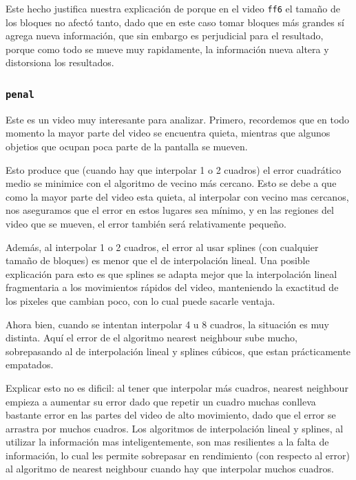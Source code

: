 Este hecho justifica nuestra explicación de porque en el video \texttt{ff6} el tamaño de los bloques no afectó tanto, dado que en este caso tomar bloques más grandes sí agrega nueva información, que sin embargo es perjudicial para el resultado, porque como todo se mueve muy rapidamente, la información nueva altera y distorsiona los resultados.

\subsubsection{\texttt{penal}}

Este es un video muy interesante para analizar. Primero, recordemos que en todo momento la mayor parte del video se encuentra quieta, mientras que algunos objetios que ocupan poca parte de la pantalla se mueven. 

Esto produce que (cuando hay que interpolar 1 o 2 cuadros) el error cuadrático medio se minimice con el algoritmo de vecino más cercano. Esto se debe a que como la mayor parte del video esta quieta, al interpolar con vecino mas cercanos, nos aseguramos que el error en estos lugares sea mínimo, y en las regiones del video que se mueven, el error tambi\'en será relativamente pequeño.

Además, al interpolar 1 o 2 cuadros, el error al usar splines (con cualquier tamaño de bloques) es menor que el de interpolación lineal. Una posible explicación para esto es que splines se adapta mejor que la interpolación lineal fragmentaria a los movimientos rápidos del video, manteniendo la exactitud de los pixeles que cambian poco, con lo cual puede sacarle ventaja.

Ahora bien, cuando se intentan interpolar 4 u 8 cuadros, la situación es muy distinta. Aquí el error de el algoritmo nearest neighbour sube mucho, sobrepasando al de interpolación lineal y splines cúbicos, que estan prácticamente empatados.

Explicar esto no es dificil: al tener que interpolar más cuadros, nearest neighbour empieza a aumentar su error dado que repetir un cuadro muchas conlleva bastante error en las partes del video de alto movimiento, dado que el error se arrastra por muchos cuadros. Los algoritmos de interpolación lineal y splines, al utilizar la información mas inteligentemente, son mas resilientes a la falta de información, lo cual les permite sobrepasar en rendimiento (con respecto al error) al
algoritmo de nearest neighbour cuando hay que interpolar muchos cuadros.


